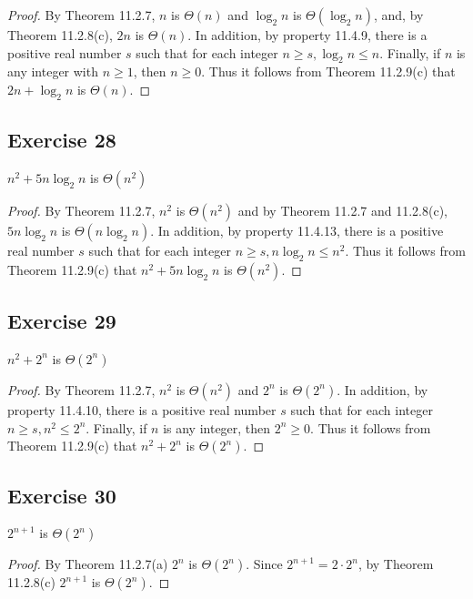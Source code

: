 \documentclass[14pt]{extarticle}
\begin{document}
\begin{proof}
    By Theorem 11.2.7, \(n\) is \(\Theta(n)\) and \(\log_2 n\) is \(\Theta(\log_2 n)\), and, by Theorem 11.2.8(c), \(2n\) is
    \(\Theta(n)\). In addition, by property 11.4.9, there is a positive real number \(s\) such that for each integer
    \(n \geq s, \log_2 n \leq n\). Finally, if \(n\) is any integer with \(n \geq 1\), then \(n \geq 0\). Thus it follows
    from Theorem 11.2.9(c) that \(2n + \log_2 n\) is \(\Theta(n)\).
\end{proof}

\subsection{Exercise 28}
\(n^2 + 5n\log_2 n\) is \(\Theta(n^2)\)

\begin{proof}
    By Theorem 11.2.7, \(n^2\) is \(\Theta(n^2)\) and by Theorem 11.2.7 and 11.2.8(c), \(5n\log_2 n\) is \(\Theta(n\log_2 n)\).
    In addition, by property 11.4.13, there is a positive real number \(s\) such that for each integer \(n \geq s, n \log_2 n
    \leq n^2\). Thus it follows from Theorem 11.2.9(c) that \(n^2 + 5n \log_2 n\) is \(\Theta(n^2)\).
\end{proof}

\subsection{Exercise 29}
\(n^2 + 2^n\) is \(\Theta(2^n)\)

\begin{proof}
    By Theorem 11.2.7, \(n^2\) is \(\Theta(n^2)\) and \(2^n\) is \(\Theta(2^n)\). In addition, by property 11.4.10, there is a
    positive real number \(s\) such that for each integer \(n \geq s, n^2 \leq 2^n\). Finally, if \(n\) is any integer, then
    \(2^n \geq 0\). Thus it follows from Theorem 11.2.9(c) that \(n^2 + 2^n\) is \(\Theta(2^n)\).
\end{proof}

\subsection{Exercise 30}
\(2^{n+1}\) is \(\Theta(2^n)\)

\begin{proof}
    By Theorem 11.2.7(a) \(2^n\) is \(\Theta(2^n)\). Since \(2^{n+1} = 2 \cdot 2^n\), by Theorem 11.2.8(c) \(2^{n+1}\) is
    \(\Theta(2^n)\).
\end{proof}
\end{document}

